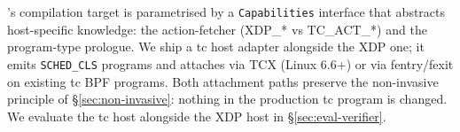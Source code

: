 \kunai's compilation target is parametrised by a \texttt{Capabilities}
interface that abstracts host-specific knowledge: the action-fetcher
(XDP\_* vs TC\_ACT\_*) and the program-type prologue. We ship a tc
host adapter alongside the XDP one; it emits \texttt{SCHED\_CLS}
programs and attaches via TCX (Linux 6.6+) or via fentry/fexit on
existing tc BPF programs. Both attachment paths preserve the
non-invasive principle of \S\ref{sec:non-invasive}: nothing in the
production tc program is changed. We evaluate the tc host alongside
the XDP host in \S\ref{sec:eval-verifier}.

